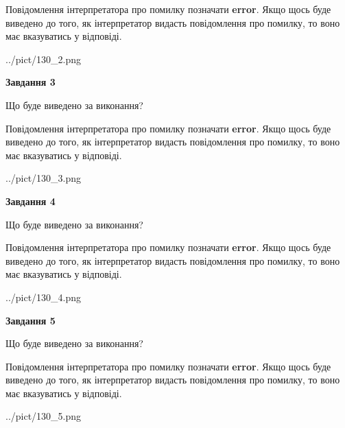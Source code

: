 \documentclass[12pt, ukrainian]{article}
\begin{document}
{\begin {large}
Повідомлення інтерпретатора про помилку позначати \textbf{error}.
Якщо щось буде виведено до того, як інтерпретатор видасть повідомлення про помилку, 
то воно має вказуватись у відповіді. \par


\begin{center}
	{../pict/130_2.png}
\end{center}
\newpage

{\begin {center}\textbf{Завдання 3}\end {center}}\par
Що буде виведено за виконання?

Повідомлення інтерпретатора про помилку позначати \textbf{error}.
Якщо щось буде виведено до того, як інтерпретатор видасть повідомлення про помилку, 
то воно має вказуватись у відповіді. \par


\begin{center}
	{../pict/130_3.png}
\end{center}
\newpage

{\begin {center}\textbf{Завдання 4}\end {center}}\par
Що буде виведено за виконання?

Повідомлення інтерпретатора про помилку позначати \textbf{error}.
Якщо щось буде виведено до того, як інтерпретатор видасть повідомлення про помилку, 
то воно має вказуватись у відповіді. \par


\begin{center}
	{../pict/130_4.png}
\end{center}
\newpage

{\begin {center}\textbf{Завдання 5}\end {center}}\par
Що буде виведено за виконання?

Повідомлення інтерпретатора про помилку позначати \textbf{error}.
Якщо щось буде виведено до того, як інтерпретатор видасть повідомлення про помилку, 
то воно має вказуватись у відповіді. \par


\begin{center}
	{../pict/130_5.png}
\end{center}
\newpage


\end{large}}
\end{document}
